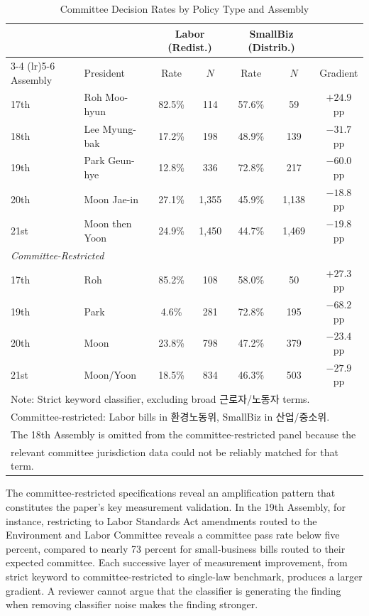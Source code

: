 \documentclass[11pt]{article}
\begin{document}
\begin{table}[H]
\centering
\caption{Committee Decision Rates by Policy Type and Assembly}
\label{tab:rates}
\begin{tabular}{llccccc}
\toprule
 & & \multicolumn{2}{c}{Labor (Redist.)} & \multicolumn{2}{c}{SmallBiz (Distrib.)} & \\
\cmidrule(lr){3-4} \cmidrule(lr){5-6}
Assembly & President & Rate & $N$ & Rate & $N$ & Gradient \\
\midrule
17th & Roh Moo-hyun        & 82.5\% & 114   & 57.6\% & 59    & $+24.9$ pp \\
18th & Lee Myung-bak       & 17.2\% & 198   & 48.9\% & 139   & $-31.7$ pp \\
19th & Park Geun-hye       & 12.8\% & 336   & 72.8\% & 217   & $-60.0$ pp \\
20th & Moon Jae-in         & 27.1\% & 1,355 & 45.9\% & 1,138 & $-18.8$ pp \\
21st & Moon then Yoon      & 24.9\% & 1,450 & 44.7\% & 1,469 & $-19.8$ pp \\
\midrule
\multicolumn{2}{l}{\textit{Committee-Restricted}} & & & & & \\
17th & Roh               & 85.2\% & 108   & 58.0\% & 50    & $+27.3$ pp \\
19th & Park              & 4.6\%  & 281   & 72.8\% & 195   & $-68.2$ pp \\
20th & Moon              & 23.8\% & 798   & 47.2\% & 379   & $-23.4$ pp \\
21st & Moon/Yoon         & 18.5\% & 834   & 46.3\% & 503   & $-27.9$ pp \\
\bottomrule
\multicolumn{7}{l}{\footnotesize Note: Strict keyword classifier, excluding broad 근로자/노동자 terms.} \\
\multicolumn{7}{l}{\footnotesize Committee-restricted: Labor bills in 환경노동위, SmallBiz in 산업/중소위.} \\
\multicolumn{7}{l}{\footnotesize The 18th Assembly is omitted from the committee-restricted panel because the} \\
\multicolumn{7}{l}{\footnotesize relevant committee jurisdiction data could not be reliably matched for that term.} \\
\end{tabular}
\end{table}

The committee-restricted specifications reveal an amplification pattern that constitutes the paper's key measurement validation. In the 19th Assembly, for instance, restricting to Labor Standards Act amendments routed to the Environment and Labor Committee reveals a committee pass rate below five percent, compared to nearly 73 percent for small-business bills routed to their expected committee. Each successive layer of measurement improvement, from strict keyword to committee-restricted to single-law benchmark, produces a larger gradient. A reviewer cannot argue that the classifier is generating the finding when removing classifier noise makes the finding stronger.
\end{document}
